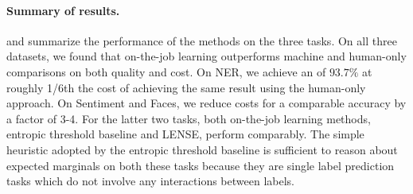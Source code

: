 \paragraph{Summary of results.}
 and  summarize the performance of the methods on the three tasks.
On all three datasets, we found that on-the-job learning outperforms machine and human-only comparisons on both quality and cost. 
On NER, we achieve an \fone{} of $93.7\%$ at roughly 1/6th the cost of achieving the same result using the human-only approach. On Sentiment and Faces, we reduce costs for a comparable accuracy by a factor of 3-4.
For the latter two tasks, both on-the-job learning methods, entropic threshold baseline and LENSE, perform comparably.
The simple heuristic adopted by the entropic threshold baseline is sufficient to reason about expected marginals on both these tasks because they are single label prediction tasks which do not involve any interactions between labels.


